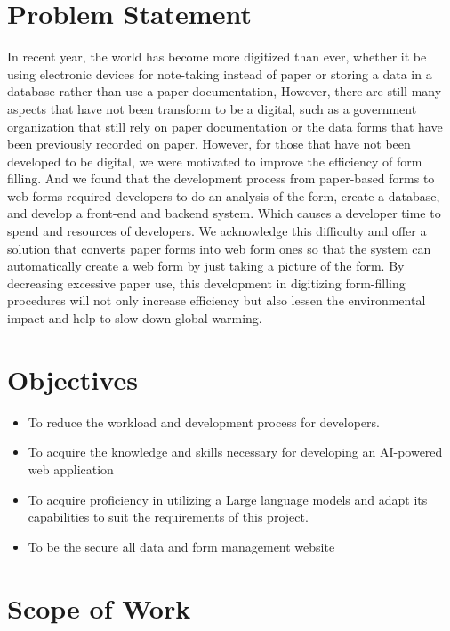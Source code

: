 \documentclass[12pt,oneside,openright,a4paper]{cpe-english-project}
\begin{document}
\section{Problem Statement} 

In recent year, the world has become more digitized than ever, whether it be using electronic devices for note-taking instead of paper or storing a data in a database rather than use a paper documentation, However, there are still many aspects that have not been transform to be a digital, such as a government organization that still rely on paper documentation or  the data forms that have been previously recorded on paper. However, for those that have not been developed to be digital, we were motivated to improve the efficiency of form filling. And we found that the development process from paper-based forms to web forms required developers to do an analysis of the form, create a database, and develop a front-end and backend system. Which causes a developer time to spend and resources of developers. We acknowledge this difficulty and offer a solution that converts paper forms into web form ones so that the system can automatically create a web form by just taking a picture of the form. By decreasing excessive paper use, this development in digitizing form-filling procedures will not only increase efficiency but also lessen the environmental impact and help to slow down global warming.

\section{Objectives}
\begin{itemize}
\item   To reduce the workload and development process for developers. 
\item   To acquire the knowledge and skills necessary for developing an AI-powered web
application
\item To acquire proficiency in utilizing a Large language models and adapt its capabilities to suit the
requirements of this project.
\item  To be the secure all data and form management website
\end{itemize}

\section{Scope of Work}
\end{document}
